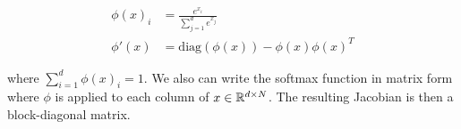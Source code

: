 \documentclass[english,11pt,a4paper]{article}
\begin{document}
\begin{equation}
	\begin{aligned}
		\phi(x)_i &= \frac{e^{x_i}}{\sum_{j=1}^{d} e^{x_j}} \\
		\phi'(x) &= \text{diag}(\phi(x)) - \phi(x) \phi(x)^T
	\end{aligned}
\end{equation}

where $\sum_{i=1}^{d}\phi(x)_i = 1$. We also can write the softmax function in matrix form where $\phi$ is applied to each column of $x \in \mathbb{R}^{d \times N}$. The resulting Jacobian is then a block-diagonal matrix.

%
%
%
%
%
%
%
\end{document}
